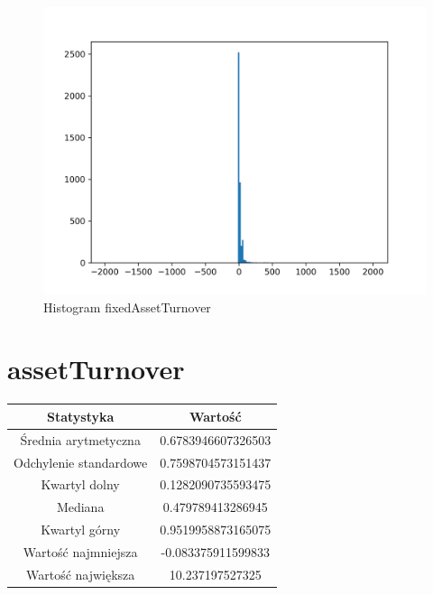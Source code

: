 \documentclass{article}
\begin{document}
\begin{figure}[h!]
    \includegraphics[width=\linewidth]{variables/fixedAssetTurnover.png}
    \caption{Histogram fixedAssetTurnover }
\end{figure}\section{ assetTurnover }

\begin{center}
    \begin{tabular}{|c | c|} 
    \hline
    Statystyka & Wartość \\
    \hline\hline
    Średnia arytmetyczna & 0.6783946607326503 \\ 
    \hline
    Odchylenie standardowe & 0.7598704573151437 \\
    \hline
    Kwartyl dolny & 0.1282090735593475 \\
    \hline
    Mediana & 0.479789413286945 \\
    \hline
    Kwartyl górny & 0.9519958873165075 \\
    \hline
    Wartość najmniejsza & -0.083375911599833 \\
    \hline
    Wartość największa & 10.237197527325 \\
    \hline
   \end{tabular}
\end{center}
\end{document}

